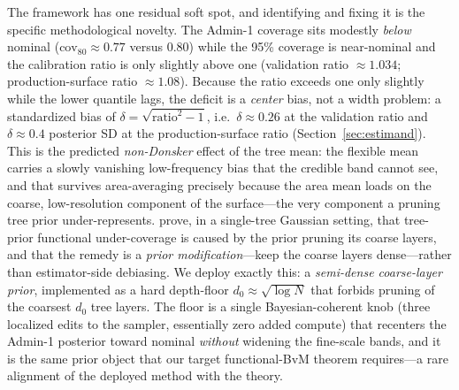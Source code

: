 \documentclass[11pt]{article}
\theoremstyle{remark}
\newcommand{\dz}{d_0}
\newcommand{\cov}{\mathrm{cov}}
\begin{document}
The framework has one residual soft spot, and identifying and fixing it is the
specific methodological novelty. The Admin-1 coverage sits modestly \emph{below}
nominal ($\cov_{80}\approx 0.77$ versus $0.80$) while the 95\% coverage is
near-nominal and the calibration ratio is only slightly above one (validation
ratio $\approx 1.034$; production-surface ratio $\approx 1.08$). Because the
ratio exceeds one only slightly while the lower quantile lags, the deficit is a
\emph{center} bias, not a width problem: a standardized bias of $\delta =
\sqrt{\mathrm{ratio}^2-1}$, i.e.\ $\delta\approx 0.26$ at the validation ratio
and $\delta\approx 0.4$ posterior SD at the production-surface ratio
(Section~\ref{sec:estimand}). This is the predicted
\emph{non-Donsker} effect of the tree mean: the flexible mean carries a slowly
vanishing low-frequency bias that the credible band cannot see, and that
survives area-averaging precisely because the area mean loads on the coarse,
low-resolution component of the surface---the very component a pruning tree prior
under-represents. \citet{castillo2021cart} prove, in a single-tree Gaussian
setting, that tree-prior functional under-coverage is caused by the prior pruning
its coarse layers, and that the remedy is a \emph{prior modification}---keep the
coarse layers dense---rather than estimator-side debiasing. We deploy exactly this:
a \emph{semi-dense coarse-layer prior}, implemented as a hard depth-floor $\dz
\approx \sqrt{\log N}$ that forbids pruning of the coarsest $\dz$ tree layers. The
floor is a single Bayesian-coherent knob (three localized edits to the sampler,
essentially zero added compute) that recenters the Admin-1 posterior toward
nominal \emph{without} widening the fine-scale bands, and it is the same prior
object that our target functional-BvM theorem requires---a rare alignment of the
deployed method with the theory.
\end{document}
